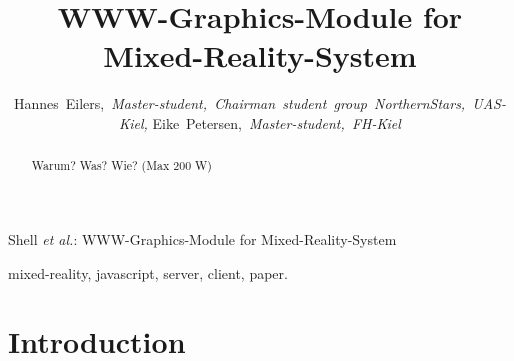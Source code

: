 \documentclass[journal]{IEEEtran}
\begin{document}
\title{WWW-Graphics-Module for Mixed-Reality-System}

\author{Hannes~Eilers,~\textit{Master-student,~Chairman~student~group~NorthernStars,~UAS-Kiel,}
Eike~Petersen,~\textit{Master-student,~FH-Kiel}}

%
{Shell \MakeLowercase{\textit{et al.}}: WWW-Graphics-Module for Mixed-Reality-System}

\maketitle

\begin{abstract}
	Warum? Was? Wie? (Max 200 W)
\end{abstract}
\begin{IEEEkeywords}
mixed-reality, javascript, server, client, paper.
\end{IEEEkeywords}

\section{Introduction}
\end{document}
